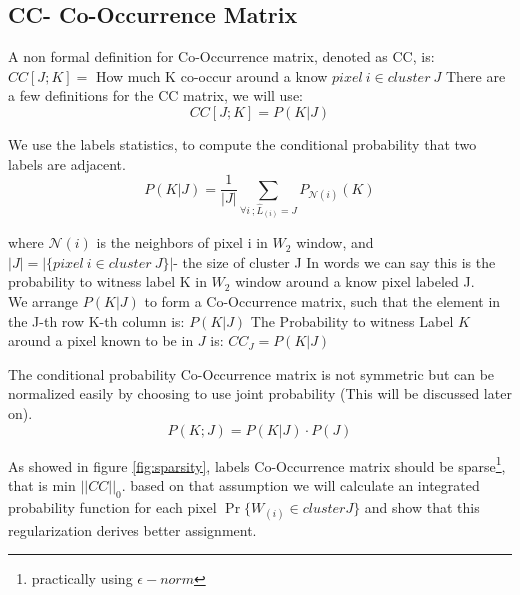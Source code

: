 \documentclass{article}
\begin{document}
\subsection{CC- Co-Occurrence Matrix}
A non formal definition for Co-Occurrence matrix, denoted as CC, is:
$ CC[J;K] =$ How much K co-occur around a know  $pixel~i\in cluster~J $
There are a few definitions for the CC matrix, we will use:
\begin{equation}
CC[J;K] =P(K|J) \tag{Conditional Co-Oc}
\end{equation}  

We use the labels statistics, to compute the conditional probability that two labels are adjacent.
\begin{equation}
P(K|J)= \frac{1}{|J|}\sum_{\forall i ~;\widehat{L}_{(i)}=J} P_{\mathcal{N}(i)}(K)
\label{eq:CoOc}
\end{equation}

where $ \mathcal{N}(i) $ is the neighbors of pixel i in $ W_2 $ window, and  $ |J|=|\{pixel\ i\in cluster\ J\}| $- the size of cluster J
In words we can say this is the probability to witness label K in $ W_2 $ window around a know pixel labeled J.\\

We arrange $ P(K|J) $ to form a Co-Occurrence matrix, such that the element in the J-th row K-th column is: $ P(K|J) $
The Probability to witness Label $ K $ around a pixel known to be in $ J $ is: $ CC_J= P(K|J) $

The conditional probability Co-Occurrence matrix is not symmetric but can be normalized easily by choosing to use joint probability (This will be discussed later on).
\begin{equation}
P(K;J)=P(K|J)\cdot P(J) \label{eq:jointprob} \tag{Joint Probabilty Co-Oc}
\end{equation}

As showed in figure \ref{fig:sparsity}, labels Co-Occurrence matrix should be sparse\footnote{practically using $ \epsilon-norm $}, that is min $||CC||_0$. based on that assumption we will calculate an integrated probability function for each pixel $\Pr \{W_{(i)}\in cluster J\}$ and show that this regularization derives better assignment. 
\end{document}
